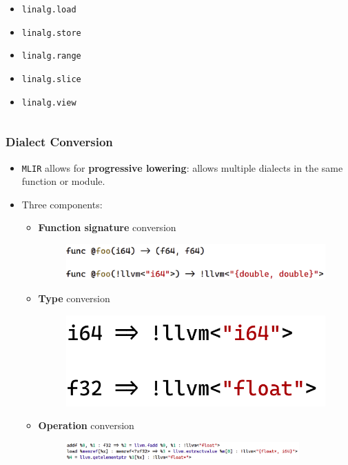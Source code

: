 \documentclass{beamer}
\begin{document}
\begin{frame}
\begin{columns}
\begin{column}{0.5\textwidth}
{\begin{itemize}
{\begin{itemize}
                \item \texttt{linalg.load}
                \item \texttt{linalg.store}
                \item \texttt{linalg.range}
                \item \texttt{linalg.slice}
                \item \texttt{linalg.view}
              \end{itemize}
            }
        \end{itemize}
      }
    \end{column}
  \end{columns}
\end{frame}

\begin{frame}
  \frametitle{Dialect Conversion}
  \begin{itemize}
    \itemsep0.5em
    \item \texttt{MLIR} allows for \textbf{progressive lowering}: allows multiple dialects in the same function or module.
    \item Three components:
      \begin{itemize}
        \itemsep0.5em
        \item \textbf{Function signature} conversion
        \begin{figure}[h]
          \raggedright
          \includegraphics[scale=0.15]{pictures/signature.png}
        \end{figure}
        \item \textbf{Type} conversion
        \begin{figure}[h]
          \raggedright
          \includegraphics[scale=0.1]{pictures/typeconversion.png}
        \end{figure}
        \item \textbf{Operation} conversion
        \begin{figure}[h]
          \raggedright
          \includegraphics[width=0.9\textwidth]{pictures/operationconversion.png}
        \end{figure}
      \end{itemize}
  \end{itemize}
\end{frame}
\end{document}
